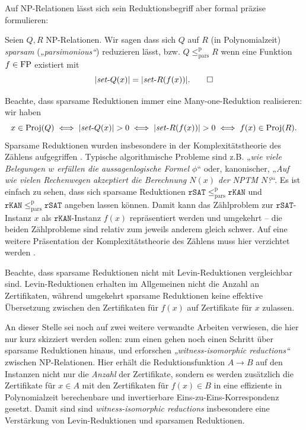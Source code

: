 Auf NP-Relationen lässt sich sein Reduktionsbegriff aber formal präzise formulieren:
\begin{definition}
    Seien $Q, R$ NP-Relationen. Wir sagen dass sich $Q$ auf $R$ (in Polynomialzeit) \emph{sparsam} (\emph{„parsimonious“}) reduzieren lässt, bzw. $Q\leq_\mathrm{pars}^\mathrm p R$ wenn eine Funktion $f\in\mathrm{FP}$ existiert mit
    \[ |\mathit{set}\text{-}{}Q(x)|=|\mathit{set}\text{-}{}R(f(x))|. \qedhere \]
\end{definition}

Beachte, dass sparsame Reduktionen immer eine Many-one-Reduktion realisieren: wir haben 
\[ x\in\Proj(Q) \iff |\fset{}Q(x)|>0 \iff |\fset{}R(f(x))|>0 \iff f(x)\in\Proj(R). \]
Sparsame Reduktionen wurden insbesondere in der Komplexitätstheorie des Zählens aufgegriffen \parencites{simon_central_1975}{valiant_complexity_1979}. Typische algorithmische Probleme sind z.B. „\emph{wie viele Belegungen $w$ erfüllen die aussagenlogische Formel $\phi$}“ oder, kanonischer, „\emph{Auf wie vielen Rechenwegen akzeptiert die Berechnung $N(x)$ der NPTM $N$?}“. Es ist einfach zu sehen, dass sich sparsame Reduktionen $\mathtt{rSAT}\leq_\mathrm{pars}^\mathrm p \mathtt{rKAN}$ und $\mathtt{rKAN}\leq_\mathrm{pars}^\mathrm p \mathtt{rSAT}$ angeben lassen können. Damit kann das Zählproblem zur $\mathtt{rSAT}$-Instanz $x$ als $\mathtt{rKAN}$-Instanz $f(x)$ repräsentiert werden und umgekehrt – die beiden Zählprobleme sind relativ zum jeweils anderem gleich schwer. Auf eine weitere Präsentation der Komplexitätstheorie des Zählens muss hier verzichtet werden \parencites(siehe)()[Kap.~7]{wechsung_vorlesungen_2000}[Chap.~17]{arora_computational_2009}.

Beachte, dass sparsame Reduktionen nicht mit Levin-Reduktionen vergleichbar sind. Levin-Reduktionen erhalten im Allgemeinen nicht die Anzahl an Zertifikaten, während umgekehrt sparsame Reduktionen keine effektive Übersetzung zwischen den Zertifikaten für $f(x)$ auf Zertifikate für $x$ zulassen.

An dieser Stelle sei noch auf zwei weitere verwandte Arbeiten verwiesen, die hier nur kurz skizziert werden sollen: zum einen gehen \textcite{wiedermann_witness-isomorphic_1995} noch einen Schritt über sparsame Reduktionen hinaus, und erforschen \emph{„witness-isomorphic reductions“} zwischen NP-Relationen. Hier erhält die Reduktionsfunktion $A\to B$ auf den Instanzen nicht nur die \emph{Anzahl} der Zertifikate, sondern es werden zusätzlich die Zertifikate für $x\in A$ mit den Zertifikaten für $f(x)\in B$ in eine effiziente in Polynomialzeit berechenbare und invertierbare Eins-zu-Eins-Korrespondenz gesetzt. Damit sind sind \emph{witness-isomorphic reductions} insbesondere eine Verstärkung von Levin-Reduktionen und sparsamen Reduktionen.

